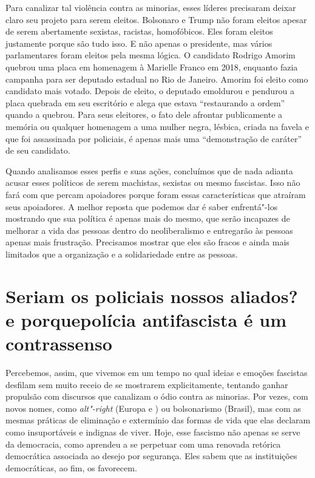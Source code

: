 Para canalizar tal violência contra as minorias, esses líderes precisaram deixar claro seu projeto para serem eleitos. Bolsonaro e Trump não foram eleitos apesar de serem abertamente sexistas, racistas, homofóbicos. Eles foram eleitos justamente porque são tudo isso. E não apenas o presidente, mas vários parlamentares foram eleitos pela mesma lógica. O candidato Rodrigo Amorim quebrou uma placa em homenagem à Marielle Franco em 2018, enquanto fazia campanha para ser deputado estadual no Rio de Janeiro. Amorim foi eleito como candidato mais votado. Depois de eleito, o deputado emoldurou e pendurou a placa quebrada em seu escritório e alega que estava ``restaurando a ordem'' quando a quebrou. Para seus eleitores, o fato dele afrontar publicamente a memória ou qualquer homenagem a uma mulher negra, lésbica, criada na favela e que foi assassinada por policiais, é apenas mais uma ``demonstração de caráter'' de seu candidato.

Quando analisamos esses perfis e suas ações, concluímos que de nada adianta acusar esses políticos de serem machistas, sexistas ou mesmo fascistas. Isso não fará com que percam apoiadores porque foram essas características que atraíram seus apoiadores. A melhor reposta que podemos dar é saber enfrentá"-los mostrando que sua política é apenas mais do mesmo, que serão incapazes de melhorar a vida das pessoas dentro do neoliberalismo e entregarão às pessoas apenas mais frustração. Precisamos mostrar que eles são fracos e ainda mais limitados que a organização e a solidariedade entre as pessoas.

\section{Seriam os policiais nossos aliados? e porque\break polícia antifascista é um contrassenso}

Percebemos, assim, que vivemos em um tempo no qual ideias e emoções fascistas desfilam sem muito receio de se mostrarem explicitamente, tentando ganhar propulsão com discursos que canalizam o ódio contra as minorias. Por vezes, com novos nomes, como \emph{alt"-right} (Europa e ) ou bolsonarismo (Brasil), mas com as mesmas práticas de eliminação e extermínio das formas de vida que elas declaram como insuportáveis e indignas de viver. Hoje, esse fascismo não apenas se serve da democracia, como aprendeu a se perpetuar com uma renovada retórica democrática associada ao desejo por segurança. Eles sabem que as instituições democráticas, ao fim, os favorecem.

